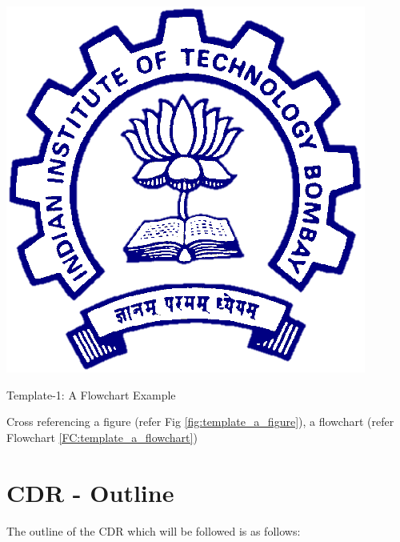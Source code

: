 \begin{Flowchart}
    \centering
    \includegraphics[scale=0.3]{Figures/Foreword/iitb_logo.png}
    \caption{Template-1: A Flowchart Example}
    \label{FC:template_a_flowchart}
\end{Flowchart}


Cross referencing a figure (refer Fig \ref{fig:template_a_figure}), a flowchart (refer Flowchart \ref{FC:template_a_flowchart})





\section{CDR - Outline}
The outline of the CDR which will be followed is as follows:

